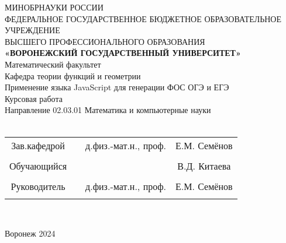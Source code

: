 
\begin{center}
	\hfill \break
	\large{МИНОБРНАУКИ РОССИИ}\\
	\footnotesize{ФЕДЕРАЛЬНОЕ ГОСУДАРСТВЕННОЕ БЮДЖЕТНОЕ ОБРАЗОВАТЕЛЬНОЕ УЧРЕЖДЕНИЕ}\\
	\footnotesize{ВЫСШЕГО ПРОФЕССИОНАЛЬНОГО ОБРАЗОВАНИЯ}\\
	\small{\textbf{«ВОРОНЕЖСКИЙ ГОСУДАРСТВЕННЫЙ УНИВЕРСИТЕТ»}}\\
	\hfill \break
	\normalsize{Математический факультет}\\
	\hfill \break
	\normalsize{Кафедра теории функций и геометрии}\\
	\hfill\break
	\hfill \break
	\hfill \break
	\hfill \break
	\large{Применение языка JavaScript для генерации ФОС ОГЭ и ЕГЭ}\\
	\hfill \break
	\hfill \break
	\hfill \break
	\hfill \break
	\hfill \break
	\normalsize{Курсовая работа\\
		\hfill \break
		Направление 02.03.01 Математика и компьютерные науки\\

		\hfill \break
	}\\
	\hfill \break
	\hfill \break
\end{center}
\hfill \break

\normalsize{
	\begin{tabular}{cccc}
		Зав.кафедрой & \underline{\hspace{3cm}} & д.физ.-мат.н.,  проф. & Е.М. Семёнов    \\\\
		Обучающийся  & \underline{\hspace{3cm}} &                       & В.Д. Китаева \\\\
		Руководитель & \underline{\hspace{3cm}} & д.физ.-мат.н.,  проф. & Е.М. Семёнов    \\\\
	\end{tabular}
}\\
\hfill \break
\hfill \break
\begin{center} Воронеж 2024 \end{center}
\thispagestyle{empty} %

